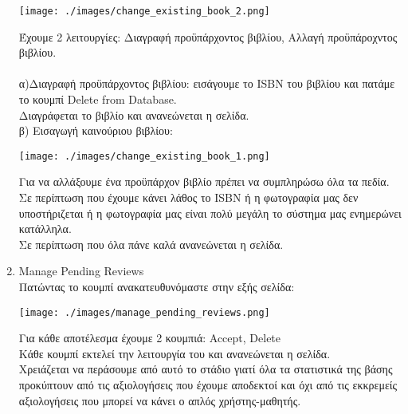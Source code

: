 \documentclass[14pt]{report}
\begin{document}
\begin{enumerate}
		\vspace{\baselineskip}
		
		\texttt{[image: ./images/change\_existing\_book\_2.png]}
		
		\vspace{\baselineskip}
		
		\newpage
		Έχουμε 2 λειτουργίες: Διαγραφή προϋπάρχοντος βιβλίου, Αλλαγή προϋπάροχντος βιβλίου. \\ \\
		α)Διαγραφή προϋπάρχοντος βιβλίου: εισάγουμε το ISBN του βιβλίου και πατάμε το κουμπί Delete from Database.\\
		Διαγράφεται το βιβλίο και ανανεώνεται η σελίδα. \\ 
		\newpage
		β) Εισαγωγή καινούριου βιβλίου: \\
		
		\vspace{\baselineskip}
		
		\texttt{[image: ./images/change\_existing\_book\_1.png]}
		
		\vspace{\baselineskip}
		
		Για να αλλάξουμε ένα προϋπάρχον βιβλίο πρέπει να συμπληρώσω όλα τα πεδία. \\
		Σε περίπτωση που έχουμε κάνει λάθος το ISBN ή η φωτογραφία μας δεν υποστήριζεται ή η φωτογραφία μας είναι πολύ μεγάλη το σύστημα μας ενημερώνει κατάλληλα. \\
		Σε περίπτωση που όλα πάνε καλά ανανεώνεται η σελίδα. \\
		
		\newpage
		\hypertarget{o-manage-pending-reviews}{}
		\item Manage Pending Reviews \\
		Πατώντας το κουμπί ανακατευθυνόμαστε στην εξής σελίδα: \\
		
		\vspace{\baselineskip}
		
		\texttt{[image: ./images/manage\_pending\_reviews.png]}
		
		\vspace{\baselineskip}
		
		Για κάθε αποτέλεσμα έχουμε 2 κουμπιά: Accept, Delete \\
		Κάθε κουμπί εκτελεί την λειτουργία του και ανανεώνεται η σελίδα. \\
		Χρειάζεται να περάσουμε από αυτό το στάδιο γιατί όλα τα στατιστικά της βάσης προκύπτουν από τις αξιολογήσεις που έχουμε αποδεκτοί και όχι από τις εκκρεμείς αξιολογήσεις που μπορεί να κάνει ο απλός χρήστης-μαθητής. \\
		

\end{enumerate}
\end{document}

